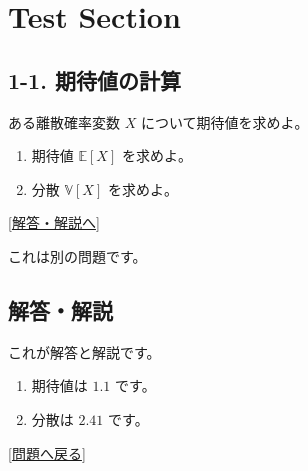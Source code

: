 \section{Test Section}\label{test-section}

\subsection{1-1.
期待値の計算}\label{ux671fux5f85ux5024ux306eux8a08ux7b97}

\protect{}\label{q:test-1}
ある離散確率変数 \(X\) について期待値を求めよ。

\begin{enumerate}
\def\labelenumi{\arabic{enumi}.}
\tightlist
\item
  期待値 \(\mathbb{E}[X]\) を求めよ。
\item
  分散 \(\mathbb{V}[X]\) を求めよ。
\end{enumerate}

\hfill 

\hyperref[a:test-1]{{[}解答・解説へ{]}}

\protect{}\label{q:test-2}
これは別の問題です。

\subsection{解答・解説}\label{ux89e3ux7b54ux89e3ux8aac}

\protect{}\label{a:test-1}
これが解答と解説です。

\begin{enumerate}
\def\labelenumi{\arabic{enumi}.}
\tightlist
\item
  期待値は \(1.1\) です。
\item
  分散は \(2.41\) です。
\end{enumerate}

\hfill 

\hyperref[q:test-1]{{[}問題へ戻る{]}}
